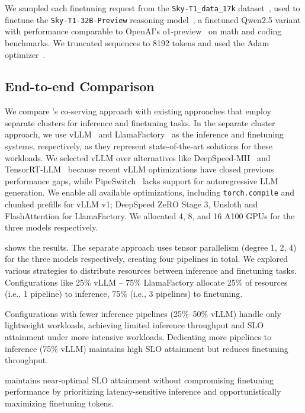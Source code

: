 We sampled each finetuning request from the \texttt{Sky-T1\_data\_17k} dataset~\cite{novasky2025dataset}, used to finetune the \texttt{Sky-T1-32B-Preview} reasoning model~\cite{novasky2025model}, a finetuned Qwen2.5 variant with performance comparable to OpenAI's o1-preview~\cite{o1-preview} on math and coding benchmarks. We truncated sequences to 8192 tokens and used the Adam optimizer~\cite{kingma2014adam}.

\subsection{End-to-end Comparison}
\label{flexllm:sec:exp:e2e}

We compare \FlexLLM's co-serving approach with existing approaches that employ separate clusters for inference and finetuning tasks. In the separate cluster approach, we use vLLM~\cite{vllm} and LlamaFactory~\cite{llamafactory} as the inference and finetuning systems, respectively, as they represent state-of-the-art solutions for these workloads. We selected vLLM over alternatives like DeepSpeed-MII~\cite{deepspeed-mii} and TensorRT-LLM~\cite{tensorrt-llm} because recent vLLM optimizations have closed previous performance gaps, while PipeSwitch~\cite{bai2020pipeswitch} lacks support for autoregressive LLM generation. We enable all available optimizations, including \texttt{torch.compile} and chunked prefills for vLLM v1; DeepSpeed ZeRO Stage 3, Unsloth and FlashAttention for LlamaFactory.
We allocated 4, 8, and 16 A100 GPUs for the three models respectively.

 shows the results. The separate approach uses tensor parallelism (degree 1, 2, 4) for the three models respectively, creating four pipelines in total. We explored various strategies to distribute resources between inference and finetuning tasks. Configurations like 25\% vLLM -- 75\% LlamaFactory allocate 25\% of resources (i.e., 1 pipeline) to inference, 75\% (i.e., 3 pipelines) to finetuning.

Configurations with fewer inference pipelines (25\%--50\% vLLM) handle only lightweight workloads, achieving limited inference throughput and SLO attainment under more intensive workloads. Dedicating more pipelines to inference (75\% vLLM) maintains high SLO attainment but reduces finetuning throughput.

\FlexLLM maintains near-optimal SLO attainment without compromising finetuning performance by prioritizing latency-sensitive inference and opportunistically maximizing finetuning tokens.

